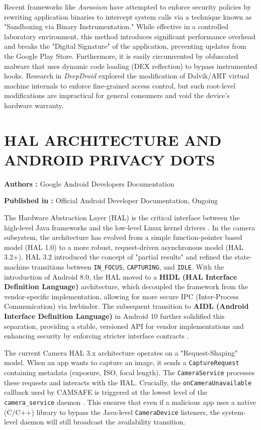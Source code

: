 \documentclass[12pt,a4paper]{report}
\begin{document}
\begin{enumerate}
    Recent frameworks like \textit{Aurasium} \cite{aurasium} have attempted to enforce security policies by rewriting application binaries to intercept system calls via a technique known as "Sandboxing via Binary Instrumentation." While effective in a controlled laboratory environment, this method introduces significant performance overhead and breaks the "Digital Signature" of the application, preventing updates from the Google Play Store. Furthermore, it is easily circumvented by obfuscated malware that uses dynamic code loading (DEX reflection) to bypass instrumented hooks. Research in \textit{DeepDroid} \cite{deepdroid} explored the modification of Dalvik/ART virtual machine internals to enforce fine-grained access control, but such root-level modifications are impractical for general consumers and void the device's hardware warranty. 

    \clearpage
    \section{HAL ARCHITECTURE AND ANDROID PRIVACY DOTS}

    \textbf{Authors :} Google Android Developers Documentation

    \textbf{Published in :} Official Android Developer Documentation, Ongoing

    The Hardware Abstraction Layer (HAL) is the critical interface between the high-level Java frameworks and the low-level Linux kernel drivers \cite{androidhal}. In the camera subsystem, the architecture has evolved from a simple function-pointer based model (HAL 1.0) to a more robust, request-driven asynchronous model (HAL 3.2+). HAL 3.2 introduced the concept of "partial results" and refined the state-machine transitions between \texttt{IN\_FOCUS}, \texttt{CAPTURING}, and \texttt{IDLE}. With the introduction of Android 8.0, the HAL moved to a \textbf{HIDL (HAL Interface Definition Language)} architecture, which decoupled the framework from the vendor-specific implementation, allowing for more secure IPC (Inter-Process Communication) via hwbinder. The subsequent transition to \textbf{AIDL (Android Interface Definition Language)} in Android 10 further solidified this separation, providing a stable, versioned API for vendor implementations and enhancing security by enforcing stricter interface contracts \cite{androidhal}.

    The current Camera HAL 3.x architecture operates on a "Request-Shaping" model. When an app wants to capture an image, it sends a \texttt{CaptureRequest} containing metadata (exposure, ISO, focal length). The \texttt{CameraService} processes these requests and interacts with the HAL. Crucially, the \texttt{onCameraUnavailable} callback used by CAMSAFE is triggered at the lowest level of the \texttt{camera\_service} daemon \cite{androidhal}. This ensures that even if a malicious app uses a native (C/C++) library to bypass the Java-level \texttt{CameraDevice} listeners, the system-level daemon will still broadcast the availability transition.



\end{enumerate}
\end{document}
